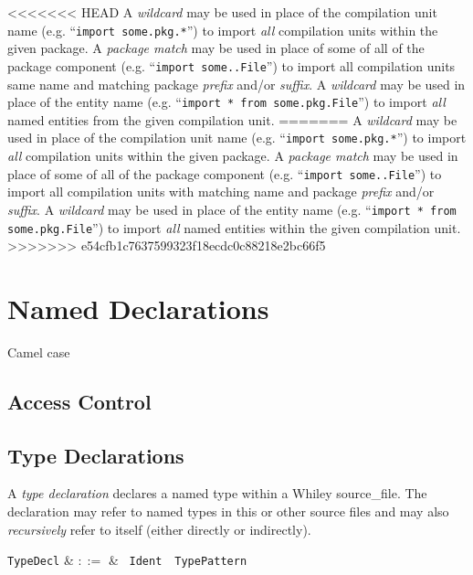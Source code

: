 <<<<<<< HEAD
A {\em wildcard} may be used in place of the compilation unit name (e.g. ``\lstinline{import some.pkg.*}'') to import {\em all} compilation units within the given package.  A {\em package match} may be used in place of some of all of the package component (e.g. ``\lstinline{import some..File}'') to import all compilation units same name and matching package {\em prefix} and/or {\em suffix}.  A {\em wildcard} may be used in place of the entity name (e.g. ``\lstinline{import * from some.pkg.File}'') to import {\em all} named entities from the given compilation unit.  
=======
A {\em wildcard} may be used in place of the compilation unit name (e.g. ``\lstinline{import some.pkg.*}'') to import {\em all} compilation units within the given package.  A {\em package match} may be used in place of some of all of the package component (e.g. ``\lstinline{import some..File}'') to import all compilation units with matching name and package {\em prefix} and/or {\em suffix}.  A {\em wildcard} may be used in place of the entity name (e.g. ``\lstinline{import * from some.pkg.File}'') to import {\em all} named entities within the given compilation unit.  
>>>>>>> e54cfb1c7637599323f18ecdc0c88218e2bc66f5

\section{Named Declarations}

Camel case

\subsection{Access Control}


\subsection{Type Declarations}
\label{c_source_files_type_decl}

A {\em type declaration} declares a named type within a Whiley \gls{source_file}.  The declaration may refer to named types in this or other source files and may also {\em recursively} refer to itself (either directly or indirectly).

\begin{syntax}
  \verb+TypeDecl+ & $::=$ & \ \verb+Ident+\ \
  \verb+TypePattern+\ \\
\end{syntax}

